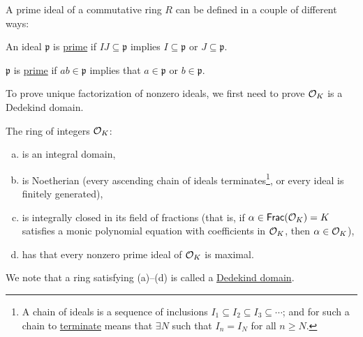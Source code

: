 \recall A prime ideal of a commutative ring $R$ can be defined in a couple of different ways:

\begin{definition}
    An ideal $\mathfrak{p}$ is \ul{prime} if $IJ\subseteq \mathfrak{p}$ implies $I\subseteq \mathfrak{p}$ or $J\subseteq \mathfrak{p}$.
\end{definition}
\begin{definition*}
    $\mathfrak{p}$ is \ul{prime} if $ab\in\mathfrak{p}$ implies that $a\in\mathfrak{p}$ or $b\in\mathfrak{p}$.
\end{definition*}

To prove unique factorization of nonzero ideals, we first need to prove $\mathcal{O}_K$ is a Dedekind domain.
\begin{theorem}
    The ring of integers $\mathcal{O}_K$:
    \begin{enumerate}[a)]
        \item is an integral domain,
        \item is Noetherian (every ascending chain of ideals terminates\footnote{A chain of ideals is a sequence of inclusions $I_1\subseteq I_2\subseteq I_3\subseteq \cdots$; and for such a chain to \ul{terminate} means that $\exists N$ such that $I_n = I_N$ for all $n\geq N$.}, or every ideal is finitely generated),
        \item is integrally closed in its field of fractions (that is, if $\alpha\in\mathsf{Frac}(\mathcal{O}_K) = K$ satisfies a monic polynomial equation with coefficients in $\mathcal{O}_K$, then $\alpha\in\mathcal{O}_K$),
        \item has that every nonzero prime ideal of $\mathcal{O}_K$ is maximal.
    \end{enumerate}
    We note that a ring satisfying (a)--(d) is called a \ul{Dedekind domain}.
\end{theorem}

